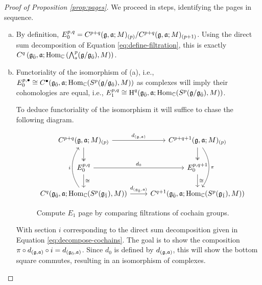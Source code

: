 \begin{proof}[Proof of Proposition \ref{prop:pages}]
    We proceed in steps, identifying the pages in sequence.
  \begin{enumerate}[(a)]
\item   By definition, $E_0^{p,q} = C^{p+q}(\mathfrak{g},\mathfrak{a};M)_{(p)}/C^{p+q}(\mathfrak{g},\mathfrak{a};M)_{(p+1)}$. Using the direct sum decomposition of Equation \ref{eq:define-filtration}, this is exactly $C^q\left({\mathfrak{g}}_{\bar{0}},\mathfrak{a};\operatorname{Hom}_{\mathbb{C}}\left(\bigwedge\nolimits^{p}_s(\mathfrak{g}/{\mathfrak{g}}_{\bar{0}}),M\right)\right)$.
\item Functoriality of the isomorphism of (a), i.e., $E_0^{p,\bullet} \cong C^\bullet({\mathfrak{g}}_{\bar{0}},\mathfrak{a};\operatorname{Hom}_{\mathbb{C}}(S^p(\mathfrak{g}/{\mathfrak{g}}_{\bar{0}}),M))$ as complexes will imply their cohomologies are equal, i.e.,  $E_1^{p,q} \cong \operatorname{H}^q({\mathfrak{g}}_{\bar{0}},\mathfrak{a};\operatorname{Hom}_{\mathbb{C}}(S^p(\mathfrak{g}/{\mathfrak{g}}_{\bar{0}}),M))$.

  To deduce functoriality of the isomorphism it will suffice to chase the following diagram.
  \begin{figure}[h]
    \[
    \begin{tikzcd}
      C^{p+q}(\g,\a;M)_{(p)} \arrow[r,"d_{(\g,\a)}"] \arrow[d,twoheadrightarrow] & C^{p+q+1}(\g,\a;M)_{(p)} \arrow[d,twoheadrightarrow] \arrow[dd,bend left=35,"\pi"] \\
      E_0^{p,q} \arrow[r,"d_0"] \arrow[d,"\cong"] & E_0^{p,q+1} \arrow[d,"\cong"] \\
      C^q(\even{\g},\a;\Hom_\CC(S^p(\odd{\g}),M)) \arrow[r,"d_{(\even{\g},\a)}"] \arrow[uu,bend left=35,"i"] & C^{q+1}(\even{\g},\a;\Hom_\CC(S^p(\odd{\g}),M))
    \end{tikzcd}
  \]
  \label{fig:comm-diag}
  \caption{Compute $E_1$ page by comparing filtrations of cochain groups.}
  \end{figure}
  With section $i$ corresponding to the direct sum decomposition given in Equation \ref{eq:decompose-cochains}. The goal is to show the composition $ \pi \circ d_{(\mathfrak{g},\mathfrak{a})}\circ i = d_{({\mathfrak{g}}_{\bar{0}},\mathfrak{a})}$. Since $d_0$ is defined by $d_{(\mathfrak{g},\mathfrak{a})}$, this will show the bottom square commutes, resulting in an isomorphism of complexes.


\end{enumerate}
\end{proof}
